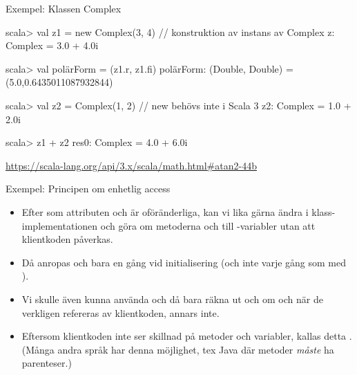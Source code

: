 \begin{Slide}{Exempel: Klassen Complex}\SlideFontSmall
{}
\begin{REPL}
scala> val z1 = new Complex(3, 4)  // konstruktion av instans av Complex
z: Complex = 3.0 + 4.0i

scala> val polärForm = (z1.r, z1.fi)
polärForm: (Double, Double) = (5.0,0.6435011087932844)

scala> val z2 = Complex(1, 2)   // new behövs inte i Scala 3
z2: Complex = 1.0 + 2.0i

scala> z1 + z2
res0: Complex = 4.0 + 6.0i
\end{REPL}
\url{https://scala-lang.org/api/3.x/scala/math.html#atan2-44b}
\end{Slide}



\begin{Slide}{Exempel: Principen om enhetlig access}\SlideFontSmall
{}
\pause
\begin{itemize}
\item Efter som attributen  och  är oföränderliga, kan vi lika gärna ändra i klass-implementationen och göra om metoderna  och  till -variabler utan att klientkoden påverkas.

\item Då anropas  och  bara en gång vid initialisering (och inte varje gång som med ).

\item Vi skulle även kunna använda  och då bara räkna ut  och  om och när de verkligen refereras av klientkoden, annars inte.

\item Eftersom klientkoden inte ser skillnad på metoder och variabler, kallas detta . (Många andra språk har  denna möjlighet, tex Java där metoder \emph{måste} ha parenteser.)
\end{itemize}
\end{Slide}




